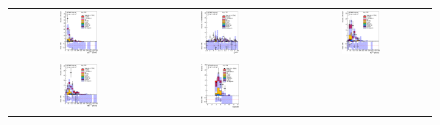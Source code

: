 \begin{figure}[h!]
\begin{center}
\begin{tabular}{ccc}
%
\includegraphics[width=0.30\textwidth]{appendices/figures/sdrs/LepPt_ELEMUONCR9_1W_NOMINAL.eps} &
\includegraphics[width=0.30\textwidth]{appendices/figures/sdrs/LepEta_ELEMUONCR9_1W_NOMINAL.eps} &
\includegraphics[width=0.30\textwidth]{appendices/figures/sdrs/MET_ELEMUONCR9_1W_NOMINAL.eps} \\
\includegraphics[width=0.30\textwidth]{appendices/figures/sdrs/Wlep_MassT_ELEMUONCR9_1W_NOMINAL.eps} &
\includegraphics[width=0.30\textwidth]{appendices/figures/sdrs/Njets25_ELEMUONCR9_1W_NOMINAL.eps}  &

\end{tabular}
\end{center}
\end{figure}
